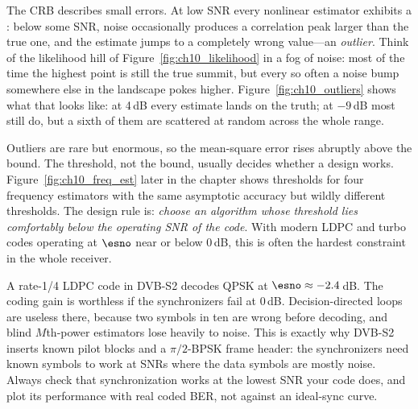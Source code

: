 The CRB describes small errors. At low SNR every nonlinear estimator exhibits a :
below some SNR, noise occasionally produces a correlation peak larger than the true one, and the
estimate jumps to a completely wrong value---an \emph{outlier}. Think of the likelihood hill of
Figure~\ref{fig:ch10_likelihood} in a fog of noise: most of the time the highest point is still
the true summit, but every so often a noise bump somewhere else in the landscape pokes higher.
Figure~\ref{fig:ch10_outliers} shows what that looks like: at 4\,dB every estimate lands on the
truth; at $-9$\,dB most still do, but a sixth of them are scattered at random across the whole
range.

Outliers are rare but enormous, so the mean-square error rises abruptly above the bound. The
threshold, not the bound, usually decides whether a design works.
Figure~\ref{fig:ch10_freq_est} later in the chapter shows thresholds for four frequency estimators
with the same asymptotic accuracy but wildly different thresholds. The design rule is:
\emph{choose an algorithm whose threshold lies comfortably below the operating SNR of the code}.
With modern LDPC and turbo codes operating at $\esno$ near or below 0\,dB, this is often the
hardest constraint in the whole receiver.


\begin{pitfall}
A rate-1/4 LDPC code in DVB-S2 decodes QPSK at $\esno\approx-2.4$\,dB. The coding gain is
worthless if the synchronizers fail at 0\,dB. Decision-directed loops are useless there, because
two symbols in ten are wrong before decoding, and blind $M$th-power estimators lose heavily to noise.
This is exactly why DVB-S2 inserts known pilot blocks and a $\pi/2$-BPSK frame header: the
synchronizers need known symbols to work at SNRs where the data symbols are mostly noise. Always
check that synchronization works at the lowest SNR your code does, and plot its performance with
real coded BER, not against an ideal-sync curve.
\end{pitfall}

